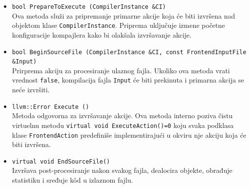 \documentclass[12pt,oneside]{memoir}
\begin{document}
\begin{itemize}
  \item \lstinline{bool PrepareToExecute (CompilerInstance &CI)} \\
  Ova metoda slu\v{z}i za pripremanje primarne akcije koja \'{c}e biti izvr\v{s}ena nad objektom klase \lstinline{CompilerInstance}.
  Priprema uklju\v{c}uje izmene po\v{c}etne konfiguracije kompajlera kako bi olak\v{s}ala izvr\v{s}avanje akcije.
  \item \lstinline{bool BeginSourceFile (CompilerInstance &CI, const FrontendInputFile &Input)} \\
  Prirprema akciju za procesiranje ulaznog fajla. Ukoliko ova metoda vrati vrednost \lstinline{false}, kompilacija fajla \lstinline{Input} \'{c}e biti prekinuta
  i primarna akcija se ne\'{c}e izvr\v{s}iti.
  \item \lstinline{llvm::Error Execute ()} \\
  Metoda odgovorna za izvr\v{s}avanje akcije. Ova metoda interno poziva \v{c}istu virtuelnu metodu \lstinline{virtual void ExecuteAction()=0}
  koju svaka podklasa klase \lstinline{FrontendAction} predefini\v{s}e implementiraju\'{c}i u okviru nje akciju koja \'ce biti izvr\v{s}ena.
  \item \lstinline{virtual void EndSourceFile()} \\ 
  Izvr\v{s}ava post-procesiranje nakon svakog fajla, dealocira objekte, obrađuje statistiku i sređuje k\^{o}d  u izlaznom fajlu.
\end{itemize}
\end{document}
